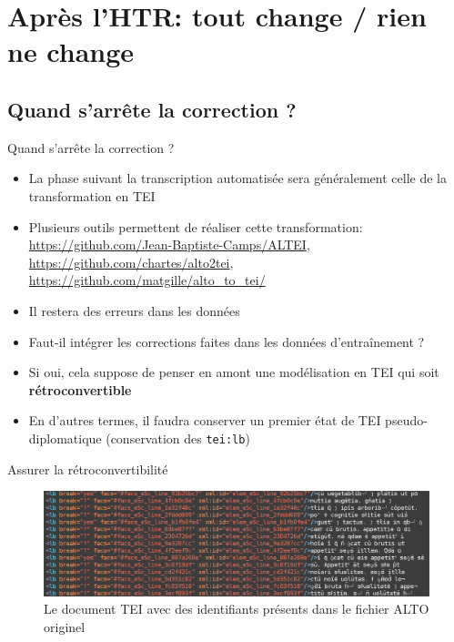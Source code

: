 \documentclass[11pt,aspectratio=169]{beamer}
\begin{document}
\section{Après l'HTR: tout change / rien ne change}

\subsection{Quand s'arrête la correction ?}
\begin{frame}{Quand s'arrête la correction ?}
\begin{center}
\begin{itemize}
\item La phase suivant la transcription automatisée sera généralement celle de la transformation en TEI
\item Plusieurs outils permettent de réaliser cette transformation: \url{https://github.com/Jean-Baptiste-Camps/ALTEI}, \url{https://github.com/chartes/alto2tei}, \url{https://github.com/matgille/alto_to_tei/}
\item Il restera des erreurs dans les données
\item Faut-il intégrer les corrections faites dans les données d'entraînement ? 
\item Si oui, cela suppose de penser en amont une modélisation en TEI qui soit \textbf{rétroconvertible}
\item En d'autres termes, il faudra conserver un premier état de TEI pseudo-diplomatique (conservation des \texttt{tei:lb})
\end{itemize}
\end{center}
\end{frame}


\begin{frame}{Assurer la rétroconvertibilité}
\begin{center}
\begin{figure}
\includegraphics[width=1\textwidth]{img/tei_retroconvertible.png}
\caption{Le document TEI avec des identifiants présents dans le fichier ALTO originel}
\end{figure}
\end{center}
\end{frame}
\end{document}

